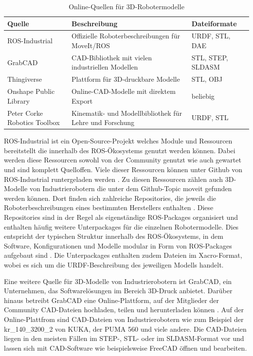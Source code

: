 \vspace{1em}
\begin{table}[H]
\centering
\begin{tabular}{|p{4cm}|p{5.5cm}|p{4cm}|}
\hline
\textbf{Quelle} & \textbf{Beschreibung} & \textbf{Dateiformate} \\
\hline
ROS-Industrial & Offizielle Roboterbeschreibungen für MoveIt/ROS & URDF, STL, DAE \\
\hline
GrabCAD & CAD-Bibliothek mit vielen industriellen Modellen & STL, STEP, SLDASM \\
\hline
Thingiverse & Plattform für 3D-druckbare Modelle & STL, OBJ \\
\hline
Onshape Public Library & Online-CAD-Modelle mit direktem Export & beliebig \\
\hline
Peter Corke Robotics Toolbox & Kinematik- und Modellbibliothek für Lehre und Forschung & URDF, STL \\
\hline
\end{tabular}
\caption{Online-Quellen für 3D-Robotermodelle}
\label{tab:robotermodelle}
\end{table}
\vspace{1em}

ROS-Industrial ist ein Open-Source-Projekt welches Module und Ressourcen bereitstellt die innerhalb des ROS-Ökosystems genutzt werden können.
Dabei werden diese Ressourcen sowohl von der Community genutzt wie auch gewartet und sind komplett Quelloffen.
Viele dieser Ressourcen können unter Github von ROS-Industrial runtergeladen werden .
Zu diesen Ressourcen zählen auch 3D-Modelle von Industrierobotern die unter dem Github-Topic moveit gefunden werden können.
Dort finden sich zahlreiche Repositories,
die jeweils die Roboterbeschreibungen eines bestimmten Herstellers enthalten .
Diese Repositories sind in der Regel als eigenständige ROS-Packages organisiert und enthalten häufig
weitere Unterpackages für die einzelnen Robotermodelle.
Dies entspricht der typischen Struktur innerhalb des ROS-Ökosystems,
in dem Software, Konfigurationen und Modelle modular in Form von ROS-Packages aufgebaut sind .
Die Unterpackages enthalten zudem Dateien im Xacro-Format, wobei es sich um die URDF-Beschreibung des jeweiligen Modells handelt.

Eine weitere Quelle für 3D-Modelle von Industrierobotern ist GrabCAD, ein Unternehmen,
das Softwarelösungen im Bereich 3D-Druck anbietet.
Darüber hinaus betreibt GrabCAD eine Online-Plattform,
auf der Mitglieder der Community CAD-Dateien hochladen, teilen und herunterladen können .
Auf der Online-Plattfrom sind CAD-Dateien von Industrierobotern wie zum Beispiel der kr\_140\_3200\_2 von KUKA,
der PUMA 560 und viele andere.
Die CAD-Dateien liegen in den meisten Fällen im STEP-, STL- oder im SLDASM-Format vor und lassen sich mit CAD-Software
wie beispielsweise FreeCAD öffnen und bearbeiten.


